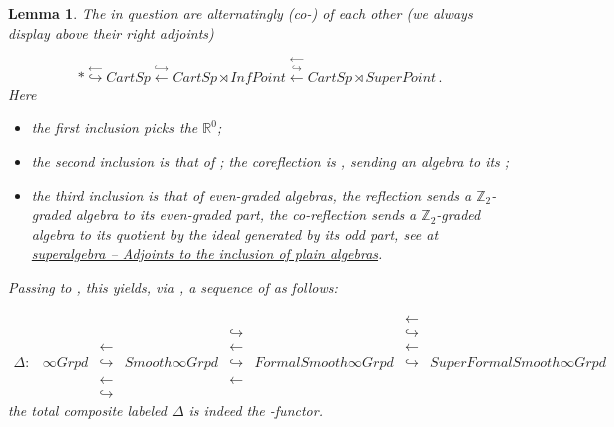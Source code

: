 \documentclass[12pt,titlepage]{article}
\newcommand{\itexarray}[1]{\begin{matrix}#1\end{matrix}}
\theoremstyle{plain}
\newtheorem{lemma}{Lemma}
\theoremstyle{definition}
\theoremstyle{remark}
\begin{document}
\begin{lemma}
\label{SequenceOfSites}\hypertarget{SequenceOfSites}{}
The  in question are alternatingly (co-) of each other (we always display  above their right adjoints)

\begin{displaymath}
\ast
  \stackrel{\longleftarrow}{\hookrightarrow}
  CartSp
  \stackrel{\hookrightarrow}{\longleftarrow}
  CartSp\rtimes InfPoint

  \stackrel{\longleftarrow}{\stackrel{\hookrightarrow}{\longleftarrow}}
  CartSp \rtimes SuperPoint
  \,.
\end{displaymath}
Here

\begin{itemize}%
\item the first inclusion picks the  $\mathbb{R}^0$;


\item the second inclusion is that of ; the coreflection is , sending an algebra to its ;


\item the third inclusion is that of even-graded algebras, the reflection sends a $\mathbb{Z}_2$-graded algebra to its even-graded part, the co-reflection sends a $\mathbb{Z}_2$-graded algebra to its quotient by the ideal generated by its odd part, see at \emph{\href{super+algebra#AdjointsToInclusionOfPlainAlgebra}{superalgebra -- Adjoints to the inclusion of plain algebras}}.



\end{itemize}
Passing to , this yields, via , a sequence of  as follows:

\begin{displaymath}
\itexarray{
    & && && &\longleftarrow&
    \\
    & && &\hookrightarrow& &\hookrightarrow&
    \\
    & &\longleftarrow& &\longleftarrow& &\longleftarrow&
    \\
    \Delta \colon
    &
    \infty Grpd
    &\hookrightarrow&
    Smooth \infty Grpd
    &\hookrightarrow&
    FormalSmooth \infty Grpd
    &\hookrightarrow&
    SuperFormalSmooth \infty Grpd
    \\
    & &\longleftarrow& &\longleftarrow&
    \\
    & &\hookrightarrow&
  }
\end{displaymath}
the total composite labeled $\Delta$ is indeed the -functor.


\end{lemma}
\end{document}
